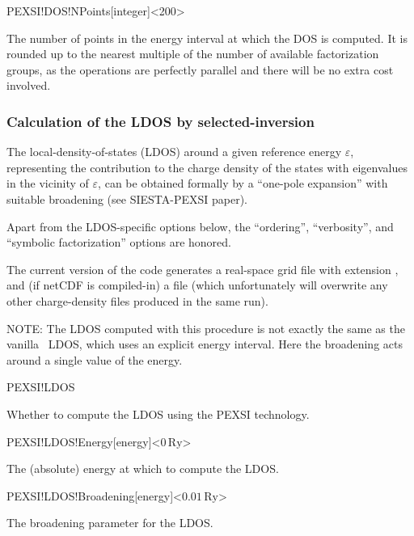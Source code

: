 \begin{fdfentry}{PEXSI!DOS!NPoints}[integer]<200>

  The number of points in the energy interval at which the DOS is
  computed. It is rounded up to the nearest multiple of the number of
  available factorization groups, as the operations are perfectly
  parallel and there will be no extra cost involved.
  
\end{fdfentry}

\subsubsection{Calculation of the LDOS by selected-inversion}
\label{pexsi-ldos}

The local-density-of-states (LDOS) around a given reference energy
$\varepsilon$, representing the contribution to the charge density of
the states with eigenvalues in the vicinity of $\varepsilon$, can be
obtained formally by a ``one-pole expansion'' with suitable broadening
(see SIESTA-PEXSI paper).

Apart from the LDOS-specific options below, the ``ordering'',
``verbosity'', and ``symbolic factorization'' options are honored.

The current version of the code generates a real-space grid file with
extension , and (if netCDF is compiled-in) a file
 (which unfortunately will overwrite any other
charge-density files produced in the same run).

NOTE: The LDOS computed with this procedure is not exactly the same as
the vanilla \siesta\ LDOS, which uses an explicit energy
interval. Here the broadening acts around a single value of the
energy.


\begin{fdflogicalF}{PEXSI!LDOS}

  Whether to compute the LDOS using the PEXSI technology.
  
\end{fdflogicalF}

\begin{fdfentry}{PEXSI!LDOS!Energy}[energy]<$0\,\mathrm{Ry}$>

  The (absolute) energy at which to compute the LDOS.

\end{fdfentry}

\begin{fdfentry}{PEXSI!LDOS!Broadening}[energy]<$0.01\,\mathrm{Ry}$>

  The broadening parameter for the LDOS.

\end{fdfentry}

